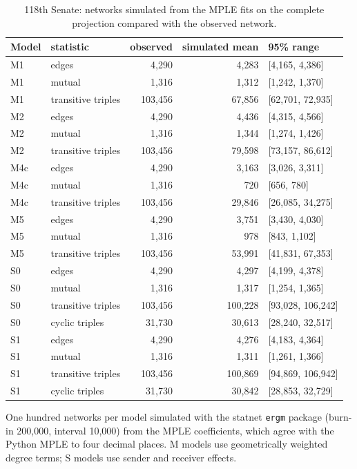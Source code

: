 \begin{table}[tbp]
\centering
\small
\caption{118th Senate: networks simulated from the MPLE fits on the complete projection compared with the observed network.}
\label{tab:mle}
\begin{tabular}{llrrl}
\toprule
Model & statistic & observed & simulated mean & 95\% range \\
\midrule
M1 & edges & 4,290 & 4,283 & [4,165, 4,386] \\
M1 & mutual & 1,316 & 1,312 & [1,242, 1,370] \\
M1 & transitive triples & 103,456 & 67,856 & [62,701, 72,935] \\
M2 & edges & 4,290 & 4,436 & [4,315, 4,566] \\
M2 & mutual & 1,316 & 1,344 & [1,274, 1,426] \\
M2 & transitive triples & 103,456 & 79,598 & [73,157, 86,612] \\
M4c & edges & 4,290 & 3,163 & [3,026, 3,311] \\
M4c & mutual & 1,316 & 720 & [656, 780] \\
M4c & transitive triples & 103,456 & 29,846 & [26,085, 34,275] \\
M5 & edges & 4,290 & 3,751 & [3,430, 4,030] \\
M5 & mutual & 1,316 & 978 & [843, 1,102] \\
M5 & transitive triples & 103,456 & 53,991 & [41,831, 67,353] \\
S0 & edges & 4,290 & 4,297 & [4,199, 4,378] \\
S0 & mutual & 1,316 & 1,317 & [1,254, 1,365] \\
S0 & transitive triples & 103,456 & 100,228 & [93,028, 106,242] \\
S0 & cyclic triples & 31,730 & 30,613 & [28,240, 32,517] \\
S1 & edges & 4,290 & 4,276 & [4,183, 4,364] \\
S1 & mutual & 1,316 & 1,311 & [1,261, 1,366] \\
S1 & transitive triples & 103,456 & 100,869 & [94,869, 106,942] \\
S1 & cyclic triples & 31,730 & 30,842 & [28,853, 32,729] \\
\bottomrule
\end{tabular}
\par\vspace{2pt}\footnotesize One hundred networks per model simulated with the statnet \texttt{ergm} package (burn-in 200,000, interval 10,000) from the MPLE coefficients, which agree with the Python MPLE to four decimal places. M models use geometrically weighted degree terms; S models use sender and receiver effects.
\end{table}
